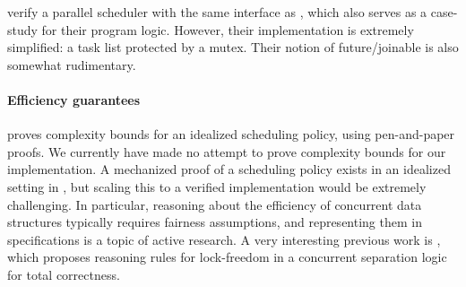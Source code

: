  verify a parallel scheduler with the same interface as \Domainslib, which also serves as a case-study for their program logic.
However, their implementation is extremely simplified: a task list protected by a mutex.
Their notion of future/joinable is also somewhat rudimentary.

\paragraph{Efficiency guarantees}

 proves complexity bounds for an idealized scheduling policy, using pen-and-paper proofs. We currently have made no attempt to prove complexity bounds for our implementation. A mechanized proof of a scheduling policy exists in an idealized setting in , but scaling this to a verified implementation would be extremely challenging. In particular, reasoning about the efficiency of concurrent data structures typically requires fairness assumptions, and representing them in \Iris specifications is a topic of active research. A very interesting previous work is \citet{csl-lockfree}, which proposes reasoning rules for lock-freedom in a concurrent separation logic for total correctness.
